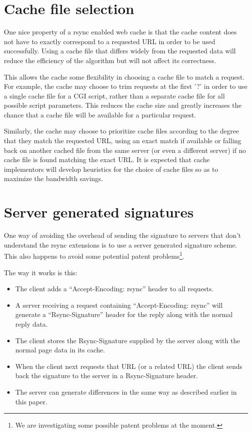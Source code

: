 \documentclass[a4paper]{article}
\begin{document}
\section*{Cache file selection}

One nice property of a rsync enabled web cache is that the cache
content does not have to exactly correspond to a requested URL in
order to be used successfully. Using a cache file that differs widely
from the requested data will reduce the efficiency of the algorithm
but will not affect its correctness. 

This allows the cache some flexibility in choosing a cache file to
match a request. For example, the cache may choose to trim requests at
the first '?' in order to use a single cache file for a CGI script,
rather than a separate cache file for all possible script parameters.
This reduces the cache size and greatly increases the chance that a
cache file will be available for a particular request.  

Similarly, the cache may choose to prioritize cache files according to
the degree that they match the requested URL, using an exact match if
available or falling back on another cached file from the same server
(or even a different server) if no cache file is found matching the
exact URL. It is expected that cache implementors will develop
heuristics for the choice of cache files so as to maximize the
bandwidth savings.

\section*{Server generated signatures}

One way of avoiding the overhead of sending the signature to servers
that don't understand the rsync extensions is to use a server
generated signature scheme. This also happens to avoid some potential
patent problems\footnote{We are investigating some possible patent
  problems at the moment.}.

The way it works is this:

\begin{itemize}
\item The client adds a ``Accept-Encoding: rsync'' header to all
  requests.
\item A server receiving a request containing ``Accept-Encoding:
  rsync'' will generate a ``Rsync-Signature'' header for the reply
  along with the normal reply data.
\item The client stores the Rsync-Signature supplied by the server
  along with the normal page data in its cache.
\item When the client next requests that URL (or a related URL) the
  client sends back the signature to the server in a Rsync-Signature
  header.
\item The server can generate differences in the same way as described
  earlier in this paper.
\end{itemize}
\end{document}
